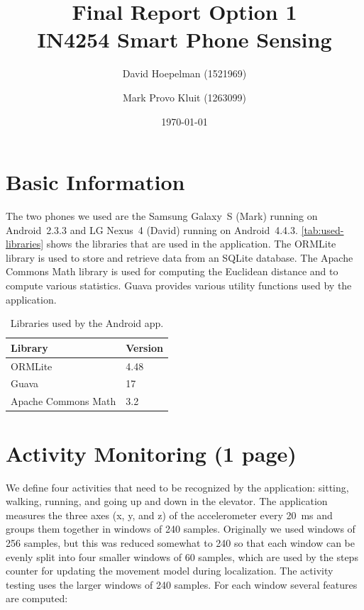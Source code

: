 \documentclass[a4paper,10pt,twoside]{IEEEtran}
\title{\huge{\textbf{Final Report Option 1}\\IN4254 Smart Phone Sensing}}
\date{\today}
\author{David Hoepelman (1521969) \and Mark Provo Kluit (1263099)}
\begin{document}
\maketitle

\newpage
{}


\newpage
{}

\section{Basic Information}
\label{sec:basic-information}
The two phones we used are the Samsung Galaxy~S (Mark) running on Android~2.3.3 and LG Nexus~4 (David) running on Android~4.4.3. \autoref{tab:used-libraries} shows the libraries that are used in the application. The ORMLite library is used to store and retrieve data from an SQLite database. The Apache Commons Math library is used for computing the Euclidean distance and to compute various statistics. Guava provides various utility functions used by the application.

\begin{table}[ht]
\centering
\caption{Libraries used by the Android app.}
\begin{tabular}{ll}
\toprule
Library & Version\\
\midrule
ORMLite & 4.48\\
Guava & 17\\
Apache Commons Math & 3.2\\
\bottomrule
\end{tabular}
\label{tab:used-libraries}
\end{table}

\section{Activity Monitoring (1 page)}
\label{sec:activity-monitoring}
We define four activities that need to be recognized by the application: sitting, walking, running, and going up and down in the elevator. The application measures the three axes (x, y, and z) of the accelerometer every 20~ms and groups them together in windows of 240 samples. Originally we used windows of 256 samples, but this was reduced somewhat to 240 so that each window can be evenly split into four smaller windows of 60 samples, which are used by the steps counter for updating the movement model during localization. The activity testing uses the larger windows of 240 samples. For each window several features are computed:
\end{document}

